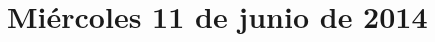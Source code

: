 \documentclass[12pt,spanish]{article}
\begin{document}
  \thispagestyle{empty}
  \pagestyle{empty}
  \section*{Miércoles 11 de junio de 2014}

  \begin{certamen}
    \item
      
      \newpage
    \item
      
  \end{certamen}
\end{document}
